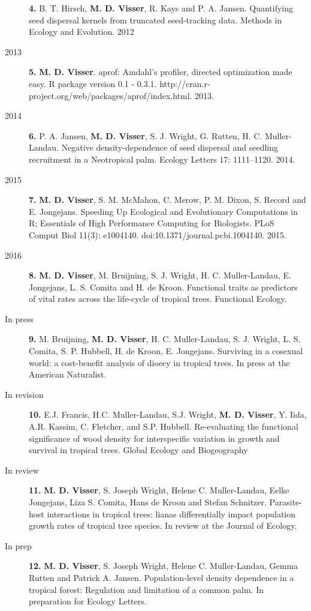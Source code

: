 \documentclass[b5paper,justified]{tufte-book} %
\begin{document}
\begin{fullwidth}
\begin{description}
\textbf{4.} B. T. Hirsch, \textbf{M. D. Visser}, R. Kays and P. A.
Jansen. Quantifying seed dispersal kernels from truncated seed-tracking
data. Methods in Ecology and Evolution. 2012
\item[2013]
\textbf{5.} \textbf{M. D. Visser}. aprof: Amdahl's profiler, directed
optimization made easy. R package version 0.1 - 0.3.1.
http://cran.r-project.org/web/packages/aprof/index.html. 2013.
\item[2014]
\textbf{6.} P. A. Jansen, \textbf{M. D. Visser}, S. J. Wright, G.
Rutten, H. C. Muller-Landau. Negative density-dependence of seed
dispersal and seedling recruitment in a Neotropical palm. Ecology
Letters 17: 1111--1120. 2014.
\item[2015]
\textbf{7.} \textbf{M. D. Visser}, S. M. McMahon, C. Merow, P. M. Dixon,
S. Record and E. Jongejans. Speeding Up Ecological and Evolutionary
Computations in R; Essentials of High Performance Computing for
Biologists. PLoS Comput Biol 11(3): e1004140.
doi:10.1371/journal.pcbi.1004140. 2015.
\item[2016]
\textbf{8.} \textbf{M. D. Visser}, M. Bruijning, S. J. Wright, H. C.
Muller-Landau, E. Jongejans, L. S. Comita and H. de Kroon. Functional
traits as predictors of vital rates across the life-cycle of tropical
trees. Functional Ecology.
\item[In press]
\textbf{9.} M. Bruijning, \textbf{M. D. Visser}, H. C. Muller-Landau, S.
J. Wright, L. S. Comita, S. P. Hubbell, H. de Kroon, E. Jongejans.
Surviving in a cosexual world: a cost-benefit analysis of dioecy in
tropical trees. In press at the American Naturalist.
\item[In revision]
\textbf{10.} E.J. Francis, H.C. Muller-Landau, S.J. Wright, \textbf{M.
D. Visser}, Y. Iida, A.R. Kassim, C. Fletcher, and S.P. Hubbell.
Re-evaluating the functional significance of wood density for
interspecific variation in growth and survival in tropical trees. Global
Ecology and Biogeography
\item[In review]
\textbf{11.} \textbf{M. D. Visser}, S. Joseph Wright, Helene C.
Muller-Landau, Eelke Jongejans, Liza S. Comita, Hans de Kroon and Stefan
Schnitzer. Parasite-host interactions in tropical trees: lianas differentially impact population growth rates of tropical tree species. In review at the Journal of Ecology.

\item[In prep]
\textbf{12.} \textbf{M. D. Visser}, S. Joseph Wright, Helene C.
Muller-Landau, Gemma Rutten and Patrick A. Jansen. Population-level density dependence in a tropical forest:  Regulation and limitation of a common palm. In preparation for Ecology Letters.


\end{description}
\end{fullwidth}
\end{document}
